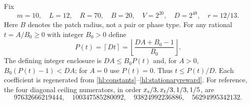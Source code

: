 Fix
\begin{equation}\label{hl:scales}
 m=10,\quad L=12,\quad R=70,\quad B=20,\quad
 V=2^{20},\quad D=2^{48},\quad r=12/13.
\end{equation}
Here $B$ denotes the patch radius, not a pair or phase type.  For
any rational $t=A/B_0\ge0$ with integer $B_0>0$ define
\begin{equation}\label{hl:rounding}
 P(t)=\left\lceil Dt\right\rceil
 =\left\lfloor\frac{DA+B_0-1}{B_0}\right\rfloor.
\end{equation}
The defining integer enclosure is $DA\le B_0P(t)$ and, for
$A>0$, $B_0(P(t)-1)<DA$; for $A=0$ use $P(t)=0$.
Thus $t\le P(t)/D$.  Each coefficient is regenerated from
\eqref{hl:constants}--\eqref{hl:stationaryreward}.  For reference,
the four diagonal ceiling numerators, in order
$x_{\rm s}/3,x_{\rm t}/3,1/3,1/5$, are
\[
 97632666219444,\quad100347585280092,\quad
 93824992236886,\quad56294995342132.
\]

